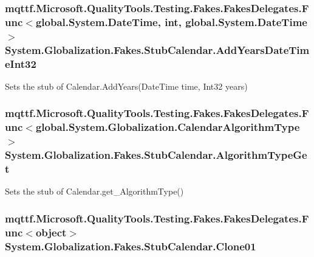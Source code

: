 \hypertarget{class_system_1_1_globalization_1_1_fakes_1_1_stub_calendar_a6cff3ddc82aeca888103246a7dad4baf}{
\subsubsection[{Add\-Years\-Date\-Time\-Int32}]{\setlength{\rightskip}{0pt plus 5cm}mqttf.\-Microsoft.\-Quality\-Tools.\-Testing.\-Fakes.\-Fakes\-Delegates.\-Func$<$global.\-System.\-Date\-Time, int, global.\-System.\-Date\-Time$>$ System.\-Globalization.\-Fakes.\-Stub\-Calendar.\-Add\-Years\-Date\-Time\-Int32}}\label{class_system_1_1_globalization_1_1_fakes_1_1_stub_calendar_a6cff3ddc82aeca888103246a7dad4baf}


Sets the stub of Calendar.\-Add\-Years(\-Date\-Time time, Int32 years)

\hypertarget{class_system_1_1_globalization_1_1_fakes_1_1_stub_calendar_a9e45355e1919f49f33d7761f07b61338}{
\subsubsection[{Algorithm\-Type\-Get}]{\setlength{\rightskip}{0pt plus 5cm}mqttf.\-Microsoft.\-Quality\-Tools.\-Testing.\-Fakes.\-Fakes\-Delegates.\-Func$<$global.\-System.\-Globalization.\-Calendar\-Algorithm\-Type$>$ System.\-Globalization.\-Fakes.\-Stub\-Calendar.\-Algorithm\-Type\-Get}}\label{class_system_1_1_globalization_1_1_fakes_1_1_stub_calendar_a9e45355e1919f49f33d7761f07b61338}


Sets the stub of Calendar.\-get\-\_\-\-Algorithm\-Type()

\hypertarget{class_system_1_1_globalization_1_1_fakes_1_1_stub_calendar_a3f02f5f59320f7a86b386b3b1cd9af38}{
\subsubsection[{Clone01}]{\setlength{\rightskip}{0pt plus 5cm}mqttf.\-Microsoft.\-Quality\-Tools.\-Testing.\-Fakes.\-Fakes\-Delegates.\-Func$<$object$>$ System.\-Globalization.\-Fakes.\-Stub\-Calendar.\-Clone01}}\label{class_system_1_1_globalization_1_1_fakes_1_1_stub_calendar_a3f02f5f59320f7a86b386b3b1cd9af38}


